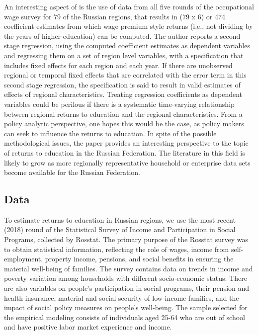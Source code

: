 \documentclass[alpha-refs]{wiley-article-03v}
\begin{document}
An interesting aspect of \cite{oshchepkov2018} is the use of data from all five rounds of the occupational wage survey for 79 of the Russian regions, that results in (79 x 6) or 474 coefficient estimates from which wage premium style returns (i.e., not dividing by the years of higher education) can be computed. The author reports a second stage regression, using the computed coefficient estimates as dependent variables and regressing them on a set of region level variables, with a specification that includes fixed effects for each region and each year. If there are unobserved regional or temporal fixed effects that are correlated with the error term in this second stage regression, the specification is said to result in valid estimates of effects of regional characteristics. Treating regression coefficients as dependent variables could be perilous if there is a systematic time-varying relationship between regional returns to education and the regional characteristics. From a policy analytic perspective, one hopes this would be the case, as policy makers can seek to influence the returns to education. In spite of the possible methodological issues, the paper provides an interesting perspective to the topic of returns to education in the Russian Federation. The literature in this field is likely to grow as more regionally representative household or enterprise data sets become available for the Russian Federation. 


\subsection{Data}
To estimate returns to education in Russian regions, we use the most recent (2018) round of the Statistical Survey of Income and Participation in Social Programs, collected by Rosstat. The primary purpose of the Rosstat survey was to obtain statistical information, reflecting the role of wages, income from self-employment, property income, pensions, and social benefits in ensuring the material well-being of families. The survey contains data on trends in income and poverty variation among households with different socio-economic status. There are also variables on people's participation in social programs, their pension and health insurance, material and social security of low-income families, and the impact of social policy measures on people's well-being. The sample selected for the empirical modeling consists of individuals aged 25-64 who are out of school and have positive labor market experience and income.
\end{document}
